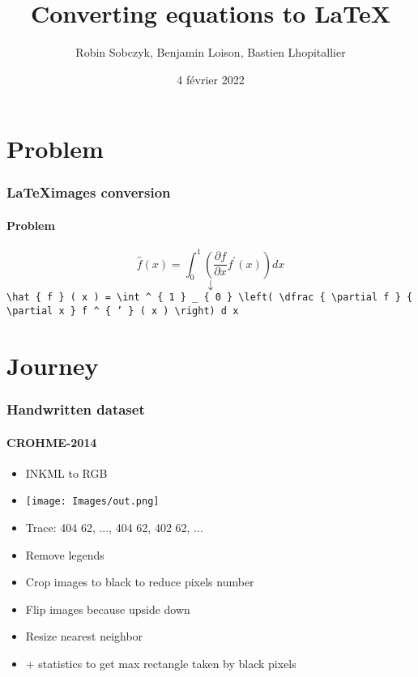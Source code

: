 \documentclass{beamer}
\title{Converting equations to \LaTeX}
\author{Robin Sobczyk, Benjamin Loison, Bastien Lhopitallier}
\date{4 février 2022}
\institute{\href{https://github.com/Benjamin-Loison/Equations-images-to-LaTeX}{https://github.com/Benjamin-Loison/Equations-images-to-LaTeX}}
\begin{document}
\begin{frame}
\titlepage
\end{frame}



\section{Problem}

\begin{frame}

    \frametitle{\LaTeX\;images conversion}
    \framesubtitle{\hfill Problem}
    
\begin{center}
    \[ \hat{f}(x) = \int^{1}_{0} \left( \dfrac{\partial f}{\partial x} f^{'}(x) \right) dx \]
    \[ \downarrow \]
    \texttt{\textbackslash hat \{ f \} ( x ) = \textbackslash int \textasciicircum~\{ 1 \} \_ \{ 0 \} \textbackslash left( \textbackslash dfrac \{ \textbackslash partial f \} \{ \textbackslash partial x \} f \textasciicircum~\{ ' \} ( x ) \textbackslash right) d x}
\end{center}

\end{frame}

\section{Journey}

\begin{frame}

    \frametitle{Handwritten dataset}
    \framesubtitle{\hfill CROHME-2014}
    
\begin{center}
\begin{itemize}[label=$\bullet$]
  \item INKML to RGB
  \item \texttt{[image: Images/out.png]}
  \pause
  \item Trace: 404 62, ..., 404 62, 402 62, ...
  
  \pause
  \item Remove legends
  \pause
  \item Crop images to black to reduce pixels number
  \pause
  \item Flip images because upside down
  \pause
  \item Resize nearest neighbor
  \pause
  \item + statistics to get max rectangle taken by black pixels
\end{itemize}
\end{center}

\end{frame}
\end{document}
